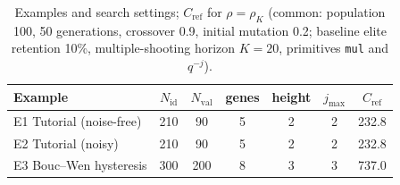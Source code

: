 \begin{table}[t]
\centering
\caption{Examples and search settings; $C_\mathrm{ref}$ for $\rho=\rho_K$ (common: population 100, 50 generations, crossover 0.9, initial mutation 0.2; baseline elite retention 10\%, multiple-shooting horizon $K=20$, primitives \texttt{mul} and $q^{-j}$).}
\label{tab:setup_K}
\setlength{\tabcolsep}{4pt}
\begin{tabular}{lcccccc}
\toprule
Example & $N_\mathrm{id}$ & $N_\mathrm{val}$ & genes & height & $j_{\max}$ & $C_\mathrm{ref}$ \\
\midrule
E1 Tutorial (noise-free) & 210 & 90 & 5 & 2 & 2 & 232.8 \\
E2 Tutorial (noisy) & 210 & 90 & 5 & 2 & 2 & 232.8 \\
E3 Bouc--Wen hysteresis & 300 & 200 & 8 & 3 & 3 & 737.0 \\
\bottomrule
\end{tabular}
\end{table}
